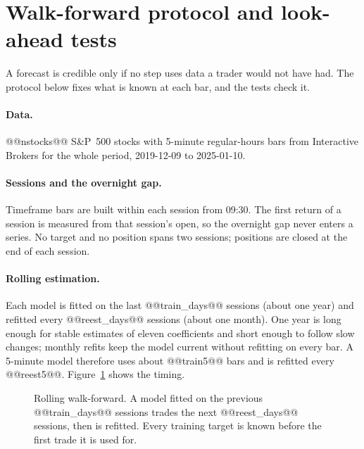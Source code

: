 \documentclass[11pt,a4paper]{article}
\begin{document}
\section{Walk-forward protocol and look-ahead tests}
\label{sec:protocol}

A forecast is credible only if no step uses data a trader would not have had. The protocol below fixes what is known at each bar, and the tests check it.


\paragraph{Data.} @@nstocks@@ S\&P~500 stocks with 5-minute regular-hours bars from Interactive Brokers for
the whole period, 2019-12-09 to 2025-01-10.

\paragraph{Sessions and the overnight gap.} Timeframe bars are built within each session from 09:30.
The first return of a session is measured from that session's open, so the overnight gap never enters a
series. No target and no position spans two sessions; positions are closed at the end of each session.

\paragraph{Rolling estimation.} Each model is fitted on the last @@train_days@@ sessions (about one year)
and refitted every @@reest_days@@ sessions (about one month). One year is long enough for stable
estimates of eleven coefficients and short enough to follow slow changes; monthly refits keep the model
current without refitting on every bar. A 5-minute model therefore uses about @@train5@@ bars and is refitted
every @@reest5@@. Figure~\ref{fig:wf} shows the timing.

\begin{figure}[htbp]
\centering
{}
\caption{Rolling walk-forward. A model fitted on the previous @@train_days@@ sessions trades the next @@reest_days@@
sessions, then is refitted. Every training target is known before the first trade it is used for.}
\label{fig:wf}
\end{figure}
\end{document}
